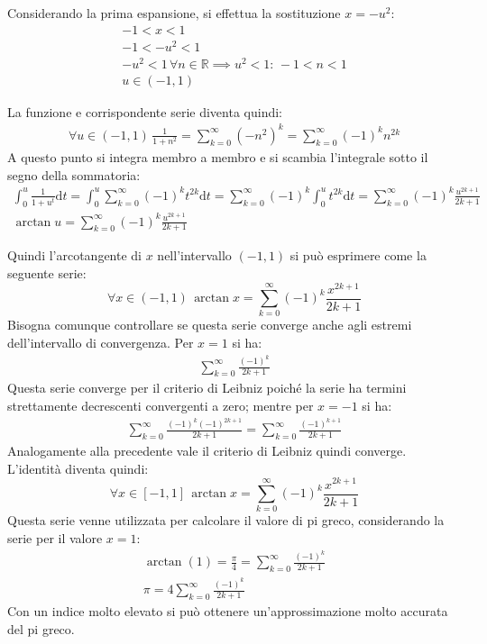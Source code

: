 \documentclass{article}
\numberwithin{equation}{subsection}
\begin{document}
Considerando la prima espansione, si effettua la sostituzione $x=-u^2$: 
\begin{gather*}
    -1<x<1\\
    -1<-u^2<1\\
    -u^2<1\,\forall n\in\mathbb{R}\implies u^2<1:\,-1<n<1\\
    u\in(-1,1)
\end{gather*}

La funzione e corrispondente serie diventa quindi:
\begin{gather*}
    \forall u\in(-1,1)\,\displaystyle\frac{1}{1+n^2}=\sum_{k=0}^\infty(-n^2)^k=
    \sum_{k=0}^\infty(-1)^kn^{2k}
\end{gather*}
A questo punto si integra membro a membro e si scambia l'integrale sotto il segno della sommatoria:
\begin{gather*}
    \displaystyle\int_0^u\frac{1}{1+u^t}\mathrm{d}t=
    \int_0^u\sum_{k=0}^\infty(-1)^kt^{2k}\mathrm{d}t=
    \sum_{k=0}^\infty(-1)^k\int_0^ut^{2k}\mathrm{d}t=
    \sum_{k=0}^\infty(-1)^k\frac{u^{2k+1}}{2k+1}\\
    \arctan u=\sum_{k=0}^\infty(-1)^k\frac{u^{2k+1}}{2k+1}
\end{gather*}

Quindi l'arcotangente di $x$ nell'intervallo $(-1,1)$ si può esprimere come la seguente serie:
\begin{equation*}
    \forall x\in(-1,1)\,\arctan x=\sum_{k=0}^\infty(-1)^k\frac{x^{2k+1}}{2k+1}
\end{equation*}
Bisogna comunque controllare se questa serie converge anche agli estremi dell'intervallo di convergenza. Per $x=1$ si ha:
\begin{gather*}
    \displaystyle\sum_{k=0}^{\infty}\frac{(-1)^k}{2k+1}
\end{gather*}
Questa serie converge per il criterio di Leibniz poiché la serie ha termini strettamente decrescenti convergenti a zero; mentre per $x=-1$ si ha:
\begin{gather*}
    \displaystyle\sum_{k=0}^{\infty}\frac{(-1)^k(-1)^{2k+1}}{2k+1}=
    \displaystyle\sum_{k=0}^{\infty}\frac{(-1)^{k+1}}{2k+1}
\end{gather*}
Analogamente alla precedente vale il criterio di Leibniz quindi converge. L'identità diventa quindi:
\begin{equation}
    \forall x\in[-1,1]\,\arctan x=\displaystyle\sum_{k=0}^\infty(-1)^k\frac{x^{2k+1}}{2k+1}
\end{equation}
Questa serie venne utilizzata per calcolare il valore di pi greco, considerando la serie per il valore $x=1$:
\begin{gather*}
    \arctan(1)=\displaystyle\frac{\pi}{4}=\displaystyle\sum_{k=0}^\infty\frac{(-1)^k}{2k+1}\\
    \pi=4\displaystyle\sum_{k=0}^\infty\frac{(-1)^k}{2k+1}
\end{gather*}
Con un indice molto elevato si può ottenere un'approssimazione molto accurata del pi greco. 
\end{document}
